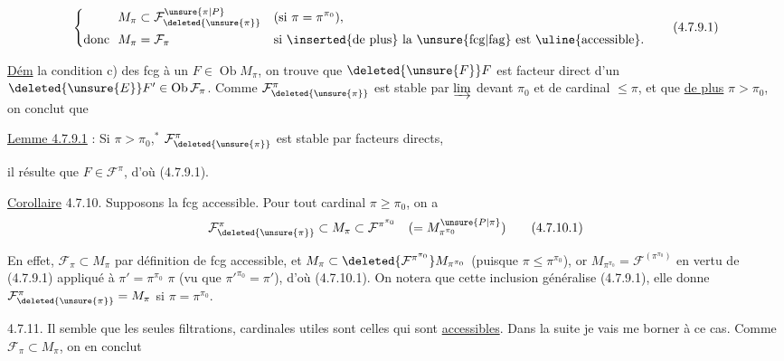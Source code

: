 \[
\left\{\begin{aligned}
M_{\pi}&\subset\mathcal F^{\unsure{\pi|P}}_{\deleted{\unsure{\pi}}}
  &&(\text{si }\pi=\pi^{\pi_0}),\\
\text{donc }\ M_{\pi}&=\mathcal F_{\pi}
  &&\text{si \inserted{de plus} la \unsure{fcg|fag} est \uline{accessible}.}
\end{aligned}\right.
\tag*{(4.7.9.1)}
\]

\uline{Dém}  la condition c) des fcg à
un $F\in\operatorname{Ob}M_\pi$, on trouve que $\deleted{\unsure{F}}F$ est facteur
direct d'un $\deleted{\unsure{E}}F'\in\operatorname{Ob}\mathcal F_\pi$. Comme $\mathcal F^\pi_{\deleted{\unsure{\pi}}}$ est
stable par $\varinjlim$  devant $\pi_0$ et de cardinal
$\leq\pi$, et que \uline{de plus} $\pi>\pi_0$, on conclut que

\uline{Lemme 4.7.9.1} : Si $\pi>\pi_0$,$^{*}$ $\mathcal F^\pi_{\deleted{\unsure{\pi}}}$ est stable par
facteurs directs,

il résulte que $F\in\mathcal F^\pi$, d'où (4.7.9.1).

\uline{Corollaire} 4.7.10. Supposons la fcg accessible.
Pour tout cardinal $\pi\geq\pi_0$, on a
\[
\mathcal F^\pi_{\deleted{\unsure{\pi}}}\subset M_\pi\subset\mathcal F^{\pi^{\pi_0}}
\quad(=M^{\unsure{P|\pi}}_{\pi^{\pi_0}})
\tag*{(4.7.10.1)}
\]

En effet, $\mathcal F_\pi\subset M_\pi$ par définition de fcg
accessible, et $M_\pi\subset\deleted{\mathcal F^{\pi^{\pi_0}}}M_{\pi^{\pi_0}}$ (puisque
$\pi\leq\pi^{\pi_0}$), or $M_{\pi^{\pi_0}}=\mathcal F^{(\pi^{\pi_0})}$ en vertu de
(4.7.9.1) appliqué à $\pi'=\pi^{\pi_0}$  $\pi$ (vu que
$\pi'^{\pi_0}=\pi'$), d'où (4.7.10.1). On notera
que cette inclusion généralise (4.7.9.1),
elle donne $\mathcal F^\pi_{\deleted{\unsure{\pi}}}=M_\pi$ si $\pi=\pi^{\pi_0}$.

4.7.11.  Il  semble que les seules  filtrations,
cardinales  utiles sont celles qui sont \uline{accessibles}.
 Dans la suite je vais me borner à ce
cas. Comme  $\mathcal F_\pi\subset M_\pi$, on en conclut
